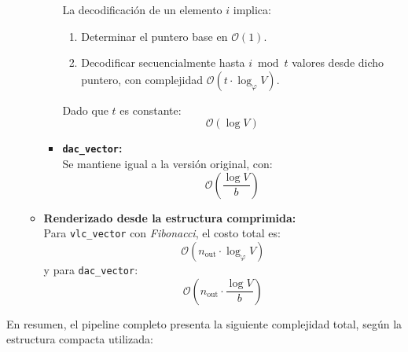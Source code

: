 \begin{enumerate}
\begin{itemize}
\begin{itemize}
                    La decodificación de un elemento \(i\) implica:
                    \begin{enumerate}
                        \item Determinar el puntero base en \(\mathcal{O}(1)\).
                        \item Decodificar secuencialmente hasta \(i \bmod t\) valores desde dicho puntero, con complejidad \(\mathcal{O}(t \cdot \log_\varphi V)\).
                    \end{enumerate}
                    
                    Dado que \(t\) es constante:
                    \[
                    \boxed{\mathcal{O}(\log V)}
                    \]
                
                \item \textbf{\texttt{dac\_vector}:} \\
                    Se mantiene igual a la versión original, con:
                    \[
                    \boxed{\mathcal{O}\left(\frac{\log V}{b}\right)}
                    \]
            \end{itemize}
        
        \item \textbf{Renderizado desde la estructura comprimida:} \\
            Para \texttt{vlc\_vector} con \textit{Fibonacci}, el costo total es:
            \[
            \mathcal{O}(n_{\text{out}} \cdot \log_\varphi V)
            \]
            y para \texttt{dac\_vector}:
            \[
            \mathcal{O}\left(n_{\text{out}} \cdot \frac{\log V}{b}\right)
            \]
    \end{itemize}
\end{enumerate}


\noindent En resumen, el pipeline completo presenta la siguiente complejidad total, según la estructura compacta utilizada:

